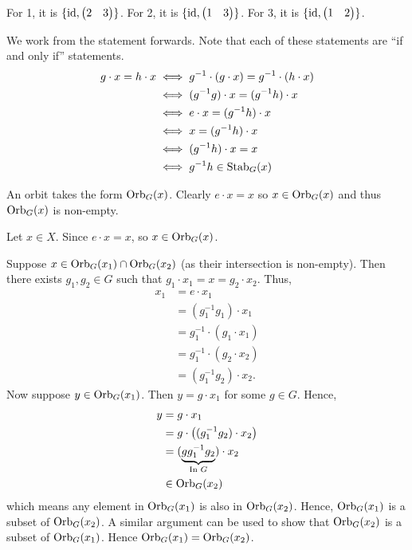 \begin{questions}
    \item For 1, it is $\{\mathrm{id}, \begin{pmatrix}2 & 3\end{pmatrix}\}$. For 2, it is $\{\mathrm{id}, \begin{pmatrix}1 & 3\end{pmatrix}\}$. For 3, it is $\{\mathrm{id}, \begin{pmatrix}1 & 2\end{pmatrix}\}$.

    \item We work from the statement forwards. Note that each of these statements are ``if and only if'' statements.
    \begin{align*}
        g \cdot x = h \cdot x &\iff g^{-1} \cdot (g \cdot x) = g^{-1} \cdot (h \cdot x)\\
        &\iff (g^{-1}g) \cdot x = (g^{-1}h) \cdot x\\
        &\iff e \cdot x = (g^{-1}h) \cdot x\\
        &\iff x = (g^{-1}h) \cdot x\\
        &\iff (g^{-1}h) \cdot x = x\\
        &\iff g^{-1}h \in \mathrm{Stab}_{G}(x)
    \end{align*}

    \item \begin{partquestions}{\alph*}
        \item An orbit takes the form $\mathrm{Orb}_{G}(x)$. Clearly $e \cdot x = x$ so $x \in \mathrm{Orb}_{G}(x)$ and thus $\mathrm{Orb}_{G}(x)$ is non-empty.
        \item Let $x \in X$. Since $e \cdot x = x$, so $x \in \mathrm{Orb}_{G}(x)$.
        \item Suppose $x \in \mathrm{Orb}_{G}(x_1) \cap \mathrm{Orb}_{G}(x_2)$ (as their intersection is non-empty). Then there exists $g_1, g_2 \in G$ such that $g_1\cdot x_1 = x = g_2\cdot x_2$. Thus,
        \begin{align*}
            x_1 &= e \cdot x_1\\
            &= (g_1^{-1}g_1)\cdot x_1\\
            &= g_1^{-1} \cdot (g_1 \cdot x_1)\\
            &= g_1^{-1} \cdot (g_2 \cdot x_2)\\
            &= (g_1^{-1}g_2) \cdot x_2.
        \end{align*}
        Now suppose $y \in \mathrm{Orb}_{G}(x_1)$. Then $y = g\cdot x_1$ for some $g \in G$. Hence,
        \begin{align*}
            y &= g\cdot x_1 \\
            &= g \cdot \left((g_1^{-1}g_2) \cdot x_2\right)\\
            &= (\underbrace{gg_1^{-1}g_2}_{\text{In } G})\cdot x_2\\
            &\in \mathrm{Orb}_{G}(x_2)
        \end{align*}
        which means any element in $\mathrm{Orb}_{G}(x_1)$ is also in $\mathrm{Orb}_{G}(x_2)$. Hence, $\mathrm{Orb}_{G}(x_1)$ is a subset of $\mathrm{Orb}_{G}(x_2)$. A similar argument can be used to show that $\mathrm{Orb}_{G}(x_2)$ is a subset of $\mathrm{Orb}_{G}(x_1)$. Hence $\mathrm{Orb}_{G}(x_1) = \mathrm{Orb}_{G}(x_2)$.
    \end{partquestions}


\end{questions}
